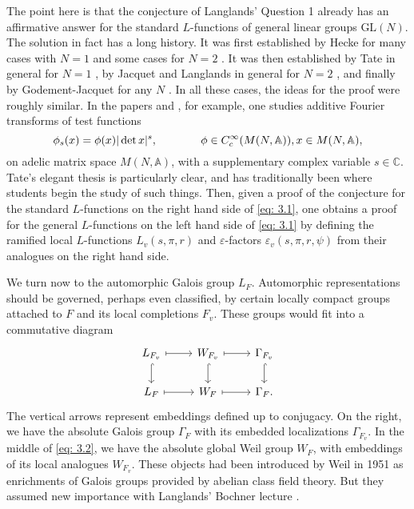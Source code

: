 \documentclass[preprint,12pt, leqno]{elsarticle}
\newcommand{\mA}{\mathbb{A}}
\newcommand{\mC}{\mathbb{C}}
\newcommand{\GL}{\mbox{GL}}
\newcommand{\SP}{\mkern70mu }
\numberwithin{equation}{section}
\theoremstyle{named}
\begin{document}
The point here is that the conjecture of Langlands' Question 1 already has an affirmative answer for the standard $L$-functions of general linear groups $\GL(N)$. The solution in fact has a long history. It was first established by Hecke for many cases with $N = 1$ \cite{N7} and some cases for $N = 2$ \cite{N8}. It was then established by Tate in general for $N = 1$ \cite{T}, by Jacquet and Langlands in general for $N = 2$ \cite{N9}, and finally by Godement-Jacquet \cite{N10} for any $N$ . In all these cases, the ideas for the proof were roughly similar. In the papers \cite{T} and \cite{N10}, for example, one studies additive Fourier transforms of test functions
\begin{equation*}
    \phi_s(x) = \phi(x)|\det x|^s, \SP \phi\in C_c^{\infty}(M(N, \mA)), x\in M(N, \mA),
\end{equation*}
on adelic matrix space $M(N, \mA)$, with a supplementary complex variable $s\in\mC$. Tate's elegant thesis \cite{T} is particularly clear, and has traditionally been where students begin the study of such things. Then, given a proof of the conjecture for the standard $L$-functions on the right hand side of \eqref{eq: 3.1}, one obtains a proof for the general $L$-functions on the left hand side of \eqref{eq: 3.1} by defining the ramified local $L$-functions $L_v(s, \pi, r)$ and $\varepsilon$-factors $\varepsilon_v(s, \pi, r, \psi)$ from their analogues on the right hand side.

We turn now to the automorphic Galois group $L_F$. Automorphic representations should be governed, perhaps even classified, by certain locally compact groups attached to $F$ and its local completions $F_v$. These groups would fit into a commutative diagram 
\begin{equation}\label{eq: 3.2}
    \begin{tikzcd}
      L_{F_v} \ar[r, mapsto]\ar[d, hook] & W_{F_v} \ar[r, mapsto]\ar[d, hook] &\Gamma_{F_v} \ar[d, hook]\\
      L_{F} \ar[r, mapsto] & W_{F} \ar[r, mapsto] & \Gamma_{F} .
  \end{tikzcd} 
\end{equation}
The vertical arrows represent embeddings defined up to conjugacy. On the right, we have the absolute Galois group $\Gamma_F$ with its embedded localizations $\Gamma_{F_v}$. In the middle of \eqref{eq: 3.2}, we have the absolute global Weil group $W_F$, with embeddings of its local analogues $W_{F_v}$. These objects had been introduced by Weil \cite{N11} in 1951 as enrichments of Galois groups provided by abelian class field theory. But they assumed new importance with Langlands' Bochner lecture \cite{L2}.
\end{document}
